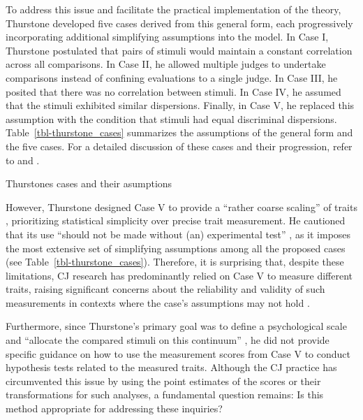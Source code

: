 \documentclass[
  authoryear,
  review,
  1p]{elsarticle}
\begin{document}
To address this issue and facilitate the practical implementation of the
theory, Thurstone developed five cases derived from this general form,
each progressively incorporating additional simplifying assumptions into
the model. In Case I, Thurstone postulated that pairs of stimuli would
maintain a constant correlation across all comparisons. In Case II, he
allowed multiple judges to undertake comparisons instead of confining
evaluations to a single judge. In Case III, he posited that there was no
correlation between stimuli. In Case IV, he assumed that the stimuli
exhibited similar dispersions. Finally, in Case V, he replaced this
assumption with the condition that stimuli had equal discriminal
dispersions. Table~\ref{tbl-thurstone_cases} summarizes the assumptions
of the general form and the five cases. For a detailed discussion of
these cases and their progression, refer to \citet{Thurstone_1927b} and
\citet[pp.~248--253]{Bramley_2008}.

\begin{table}

\caption{\label{tbl-thurstone_cases}Thurstones cases and their
asumptions}


\end{table}%

However, Thurstone designed Case V to provide a ``rather coarse
scaling'' of traits \citep[pp.~269]{Thurstone_1927b}, prioritizing
statistical simplicity over precise trait measurement. He cautioned that
its use ``should not be made without (an) experimental test''
\citep[pp.~270]{Thurstone_1927b}, as it imposes the most extensive set
of simplifying assumptions among all the proposed cases
\citetext{\citealp[pp.~253]{Bramley_2008}; \citealp[pp.~677]{Kelly_et_al_2022}}
(see Table~\ref{tbl-thurstone_cases}). Therefore, it is surprising that,
despite these limitations, CJ research has predominantly relied on Case
V to measure different traits, raising significant concerns about the
reliability and validity of such measurements in contexts where the
case's assumptions may not hold \citep[pp.~677]{Kelly_et_al_2022}.

Furthermore, since Thurstone's primary goal was to define a
psychological scale and ``allocate the compared stimuli on this
continuum'' \citep[pp.~269]{Thurstone_1927b}, he did not provide
specific guidance on how to use the measurement scores from Case V to
conduct hypothesis tests related to the measured traits. Although the CJ
practice has circumvented this issue by using the point estimates of the
scores or their transformations for such analyses, a fundamental
question remains: Is this method appropriate for addressing these
inquiries?
\end{document}
